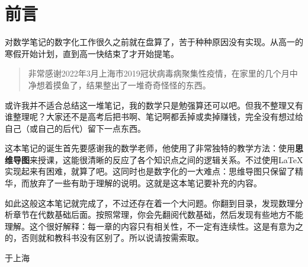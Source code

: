 \section*{前言}
对数学笔记的数字化工作很久之前就在盘算了，苦于种种原因没有实现。从高一的寒假开始计划，直到高一快结束了才开始提笔。

\begin{quote}
	非常感谢2022年3月上海市2019冠状病毒病聚集性疫情，在家里的几个月中净想着摸鱼了，结果整出了一堆奇奇怪怪的东西。
\end{quote}

或许我并不适合总结这一堆笔记，我的数学只是勉强算还可以吧。但我不整理又有谁整理呢？大家还不是高考后把书啊、笔记啊都丢掉或卖掉赚钱，完全没有想过给自己（或自己的后代）留下一点东西。

这本笔记的诞生首先要感谢我的数学老师，他使用了非常独特的教学方法：使用\textbf{思维导图}来授课，这能很清晰的反应了各个知识点之间的逻辑关系。不过使用\LaTeX{}实现起来有困难，就算了吧。这同时也是数字化的一大难点：思维导图只保留了精华，而放弃了一些有助于理解的说明。这就是这本笔记要补充的内容。

如此这般这本笔记就完成了，不过还存在着一个大问题。你翻到目录，发现数理分析章节在代数基础后面。按照常理，你会先翻阅代数基础，然后发现有些地方不能理解。这个很好解释：每一章的内容只有相关性，不一定有连续性。这是有意为之的，否则就和教科书没有区别了。所以说请按需索取。

\begin{flushright}
	\date{2022年6月}于上海
\end{flushright}
